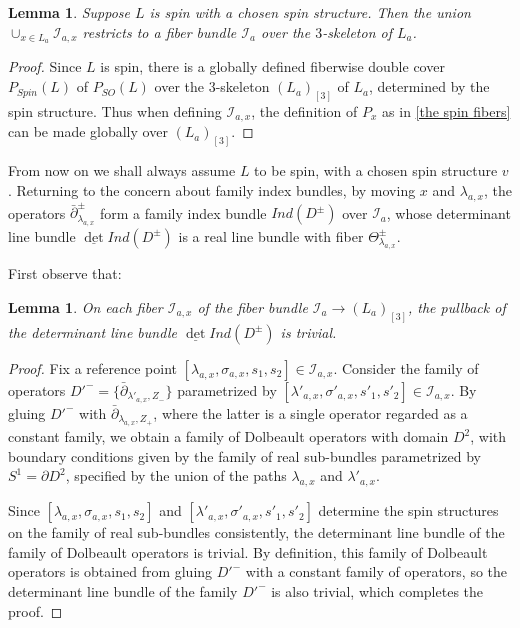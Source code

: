 \documentclass{amsart}
\newtheorem{lemma}[theorem]{Lemma}
\numberwithin{equation}{section}
\numberwithin{figure}{section}
\begin{document}
\begin{lemma}
	Suppose $L$ is spin with a chosen spin structure. Then the union $\cup_{x \in L_{a}} \mathcal{I}_{a, x}$ restricts to a fiber bundle $\mathcal{I}_{a}$ over the $3$-skeleton of $L_{a}$.
\end{lemma}
\begin{proof}
	Since $L$ is spin, there is a globally defined fiberwise double cover $P_{Spin}(L)$ of $P_{SO}(L)$ over the $3$-skeleton $(L_{a})_{[3]}$ of $L_{a}$, determined by the spin structure. Thus when defining $\mathcal{I}_{a, x}$, the definition of $P_{x}$ as in \eqref{the spin fibers} can be made globally over $(L_{a})_{[3]}$.
\end{proof}

	From now on we shall always assume $L$ to be spin, with a chosen spin structure $v$. Returning to the concern about family index bundles, by moving $x$ and $\lambda_{a, x}$, the operators $\bar{\partial}_{\lambda_{a, x}}^{\pm}$ form a family index bundle $Ind(D^{\pm})$ over $\mathcal{I}_{a}$, whose determinant line bundle $\underline{\det} Ind(D^{\pm})$ is a real line bundle with fiber $\Theta_{\lambda_{a, x}}^{\pm}$. \par
	First observe that: \par

\begin{lemma}\label{triviality of determinant line bundle on the fiber}
	On each fiber $\mathcal{I}_{a, x}$ of the fiber bundle $\mathcal{I}_{a} \to (L_{a})_{[3]}$, the pullback of the determinant line bundle $\underline{\det} Ind(D^{\pm})$ is trivial.
\end{lemma}
\begin{proof}
	Fix a reference point $[\lambda_{a, x}, \sigma_{a, x}, s_{1}, s_{2}] \in \mathcal{I}_{a, x}$. Consider the family of operators $D'^{-} = \{\bar{\partial}_{\lambda'_{a, x}, Z_{-}}\}$ parametrized by $[\lambda'_{a, x}, \sigma'_{a, x}, s'_{1}, s'_{2}] \in \mathcal{I}_{a, x}$. By gluing $D'^{-}$ with $\bar{\partial}_{\lambda_{a, x}, Z_{+}}$, where the latter is a single operator regarded as a constant family, we obtain a family of Dolbeault operators with domain $D^{2}$, with boundary conditions given by the family of real sub-bundles parametrized by $S^{1} = \partial D^{2}$, specified by the union of the paths $\lambda_{a, x}$ and $\lambda'_{a, x}$. \par
	Since $[\lambda_{a, x}, \sigma_{a, x}, s_{1}, s_{2}]$ and $[\lambda'_{a, x}, \sigma'_{a, x}, s'_{1}, s'_{2}]$ determine the spin structures on the family of real sub-bundles consistently, the determinant line bundle of the family of Dolbeault operators is trivial. By definition, this family of Dolbeault operators is obtained from gluing $D'^{-}$ with a constant family of operators, so the determinant line bundle of the family $D'^{-}$ is also trivial, which completes the proof. \par
\end{proof}
\end{document}
